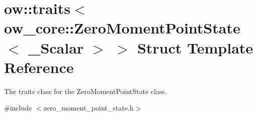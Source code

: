\hypertarget{structow_1_1traits_3_01ow__core_1_1ZeroMomentPointState_3_01__Scalar_01_4_01_4}{}\section{ow\+:\+:traits$<$ ow\+\_\+core\+:\+:Zero\+Moment\+Point\+State$<$ \+\_\+\+Scalar $>$ $>$ Struct Template Reference}
\label{structow_1_1traits_3_01ow__core_1_1ZeroMomentPointState_3_01__Scalar_01_4_01_4}


The traits class for the Zero\+Moment\+Point\+State class.  




{\ttfamily \#include $<$zero\+\_\+moment\+\_\+point\+\_\+state.\+h$>$}

